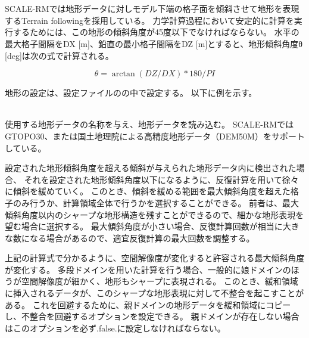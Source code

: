 \section{\SecBasicTopoSetting} \label{sec:basic_usel_topo}

SCALE-RMでは地形データに対しモデル下端の格子面を傾斜させて地形を表現するTerrain followingを採用している。
力学計算過程において安定的に計算を実行するためには、この地形の傾斜角度が45度以下でなければならない。
水平の最大格子間隔をDX [m]、鉛直の最小格子間隔をDZ [m]とすると、地形傾斜角度θ [deg]は次の式で計算される。

\[ \theta = \arctan( DZ/DX ) * 180/PI \]

地形の設定は、設定ファイルのの中で設定する。
以下に例を示す。

\\

使用する地形データの名称を与え、地形データを読み込む。
SCALE-RMではGTOPO30、または国土地理院による高精度地形データ（DEM50M）をサポートしている。

設定された地形傾斜角度を超える傾斜が与えられた地形データ内に検出された場合、
それを設定された地形傾斜角度以下になるように、反復計算を用いて徐々に傾斜を緩めていく。
このとき、傾斜を緩める範囲を最大傾斜角度を超えた格子のみ行うか、計算領域全体で行うかを選択することができる。
前者は、最大傾斜角度以内のシャープな地形構造を残すことができるので、細かな地形表現を望む場合に選択する。
最大傾斜角度が小さい場合、反復計算回数が相当に大きな数になる場合があるので、適宜反復計算の最大回数を調整する。

上記の計算式で分かるように、空間解像度が変化すると許容される最大傾斜角度が変化する。
多段ドメインを用いた計算を行う場合、一般的に娘ドメインのほうが空間解像度が細かく、地形もシャープに表現される。
このとき、緩和領域に挿入されるデータが、このシャープな地形表現に対して不整合を起こすことがある。
これを回避するために、親ドメインの地形データを緩和領域にコピーし、不整合を回避するオプションを設定できる。
親ドメインが存在しない場合はこのオプションを必ず.false.に設定しなければならない。
